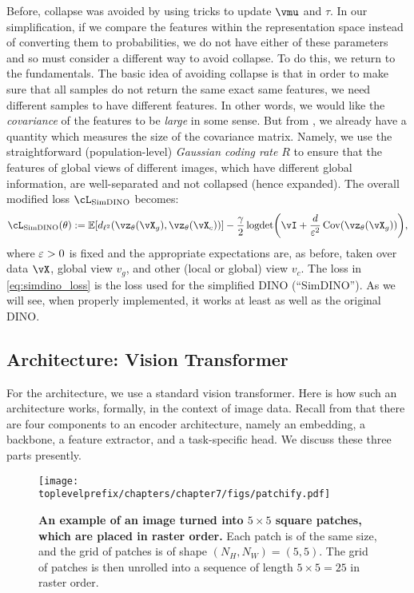 \documentclass[\toplevelprefix/book-main.tex]{subfiles}
\begin{document}
Before, collapse was avoided by using tricks to update \(\vmu\) and \(\tau\). In our simplification, if we compare the features within the representation space instead of converting them to probabilities, we do not have either of these parameters and so must consider a different way to avoid collapse. To do this, we return to the fundamentals. The basic idea of avoiding collapse is that in order to make sure that all samples do not return the same exact same features, we need different samples to have different features. In other words, we would like the \textit{covariance} of the features to be \textit{large} in some sense. But from , we already have a quantity which measures the size of the covariance matrix. Namely, we use the straightforward (population-level) \textit{Gaussian coding rate} \(R\) to ensure that the features of global views of different images, which have different global information, are well-separated and not collapsed (hence expanded). The overall modified loss \(\cL_{\simdino}\) becomes:
\begin{equation}\label{eq:simdino_loss}
    \cL_{\simdino}(\theta) := \Ex[d_{\ell^{2}}(\vz_{\theta}(\vX_{g}), \vz_{\theta}(\vX_{c}))] - \frac{\gamma}{2}\logdet\rp{\vI + \frac{d}{\eps^{2}}\Cov(\vz_{\theta}(\vX_{g}))},
\end{equation}
where \(\varepsilon > 0\) is fixed and the appropriate expectations are, as before, taken over data \(\vX\), global view \(v_{g}\), and other (local or global) view \(v_{c}\). The loss in \eqref{eq:simdino_loss} is the loss used for the simplified DINO (``SimDINO''). As we will see, when properly implemented, it works at least as well as the original DINO.

\subsection{Architecture: Vision Transformer}\label{sub:contrastive_learning_architecture}

For the architecture, we use a standard vision transformer. Here is how such an architecture works, formally, in the context of image data. Recall from  that there are four components to an encoder architecture, namely an embedding, a backbone, a feature extractor, and a task-specific head. We discuss these three parts presently.

\begin{figure}
    \centering 
    \texttt{[image: \\toplevelprefix/chapters/chapter7/figs/patchify.pdf]}
    \caption{\small\textbf{An example of an image turned into \(5 \times 5\) square patches, which are placed in raster order.} Each patch is of the same size, and the grid of patches is of shape \((N_{H}, N_{W}) = (5, 5)\). The grid of patches is then unrolled into a sequence of length \(5 \times 5 = 25\) in raster order.}
    \label{fig:patchify_rasterize}
\end{figure}
\end{document}
